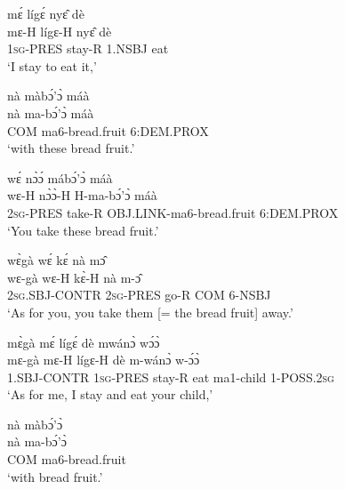\begin{exe} 
\exN\label{64}
  \glll  mɛ́ lígɛ́ nyɛ̂ dè \\
        mɛ-H lígɛ-H nyɛ̂ dè \\
         1\textsc{sg}-PRES stay-R 1.NSBJ eat   \\
    \trans `I stay to eat it,'
\end{exe}

\begin{exe} 
\exN\label{65}
  \glll  nà màbɔ́'ɔ̀ máà \\
         nà ma-bɔ́'ɔ̀ máà \\
         COM ma6-bread.fruit 6:DEM.PROX \\
    \trans `with these bread fruit.'
\end{exe}

\begin{exe} 
\exN\label{66}
  \glll wɛ́ nɔ̀ɔ́ mábɔ́'ɔ̀ máà \\
       wɛ-H nɔ̀ɔ̀-H H-ma-bɔ́'ɔ̀ máà \\
         2\textsc{sg}-PRES take-R OBJ.LINK-ma6-bread.fruit 6:DEM.PROX \\
    \trans `You take these bread fruit.'
\end{exe}

\begin{exe} 
\exN\label{67}
  \glll wɛ̀gà wɛ́ kɛ́ nà mɔ̂ \\
       wɛ-gà wɛ-H kɛ̀-H nà m-ɔ̂ \\
          2\textsc{sg}.SBJ-CONTR 2\textsc{sg}-PRES go-R COM 6-NSBJ  \\
    \trans `As for you, you take them [= the bread fruit] away.'
\end{exe}

\begin{exe} 
\exN\label{68}
  \glll  mɛ̀gà mɛ́ lígɛ́ dè mwánɔ̀ wɔ́ɔ̀ \\
        mɛ-gà mɛ-H lígɛ-H dè m-wánɔ̀ w-ɔ́ɔ̀ \\
          1.SBJ-CONTR 1\textsc{sg}-PRES stay-R eat ma1-child 1-POSS.2\textsc{sg}  \\
    \trans `As for me, I stay and eat your child,'
\end{exe}

\begin{exe} 
\exN\label{69}
  \glll nà màbɔ́'ɔ̀ \\
        nà ma-bɔ́'ɔ̀ \\
         COM ma6-bread.fruit \\
    \trans `with bread fruit.'
\end{exe}

